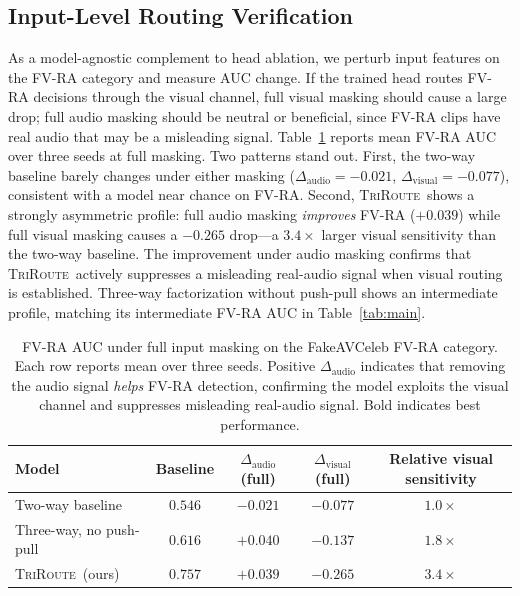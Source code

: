 \documentclass{article}
\newcommand{\method}{\textsc{TriRoute}}
\begin{document}
\subsection{Input-Level Routing Verification}

As a model-agnostic complement to head ablation, we perturb input features on the FV-RA category and measure AUC change. If the trained head routes FV-RA decisions through the visual channel, full visual masking should cause a large drop; full audio masking should be neutral or beneficial, since FV-RA clips have real audio that may be a misleading signal. Table~\ref{tab:perturbation} reports mean FV-RA AUC over three seeds at full masking. Two patterns stand out. First, the two-way baseline barely changes under either masking ($\Delta_{\mathrm{audio}}=-0.021$, $\Delta_{\mathrm{visual}}=-0.077$), consistent with a model near chance on FV-RA. Second, \method\ shows a strongly asymmetric profile: full audio masking \emph{improves} FV-RA ($+0.039$) while full visual masking causes a $-0.265$ drop---a $3.4\times$ larger visual sensitivity than the two-way baseline. The improvement under audio masking confirms that \method\ actively suppresses a misleading real-audio signal when visual routing is established. Three-way factorization without push-pull shows an intermediate profile, matching its intermediate FV-RA AUC in Table~\ref{tab:main}.

\begin{table}[t]
    \centering
    \caption{FV-RA AUC under full input masking on the FakeAVCeleb FV-RA category. Each row reports mean over three seeds. Positive $\Delta_{\mathrm{audio}}$ indicates that removing the audio signal \emph{helps} FV-RA detection, confirming the model exploits the visual channel and suppresses misleading real-audio signal. Bold indicates best performance.}
    \label{tab:perturbation}
    \small
    \begin{tabular}{lcccc}
        \toprule
        Model & Baseline & $\Delta_{\mathrm{audio}}$ (full) & $\Delta_{\mathrm{visual}}$ (full) & Relative visual sensitivity \\
        \midrule
        Two-way baseline        & $0.546$ & $-0.021$ & $-0.077$ & $1.0\times$ \\
        Three-way, no push-pull & $0.616$ & $+0.040$ & $-0.137$ & $1.8\times$ \\
        \method\ (ours)         & $\mathbf{0.757}$ & $\mathbf{+0.039}$ & $\mathbf{-0.265}$ & $\mathbf{3.4\times}$ \\
        \bottomrule
    \end{tabular}
\end{table}
\end{document}
